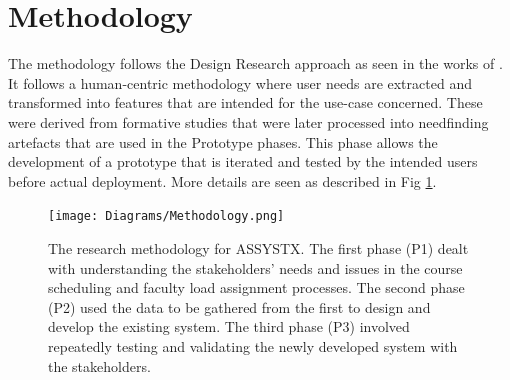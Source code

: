 
\section{Methodology}
The methodology follows the Design Research approach as seen in the works of \cite{deja2018myosl, deja2018flow, chan2019applying}. It follows a human-centric methodology where user needs are extracted and transformed into features that are intended for the use-case concerned. These were derived from formative studies that were later processed into needfinding artefacts  that are used in the Prototype phases. This phase allows the development of a prototype that is iterated and tested by the intended users before actual deployment. More details are seen as described in Fig \ref{fig:pipelinediagram}. 
\begin{figure}[h]
   \centering
   \texttt{[image: Diagrams/Methodology.png]}
   \caption{The research methodology for ASSYSTX. The first phase (P1) dealt with understanding the stakeholders' needs and issues in the course scheduling and faculty load assignment processes. The second phase (P2) used the data to be gathered from the first to design and develop the existing system. The third phase (P3) involved repeatedly testing and validating the newly developed system with the stakeholders.}
    \label{fig:pipelinediagram}
\end{figure}
